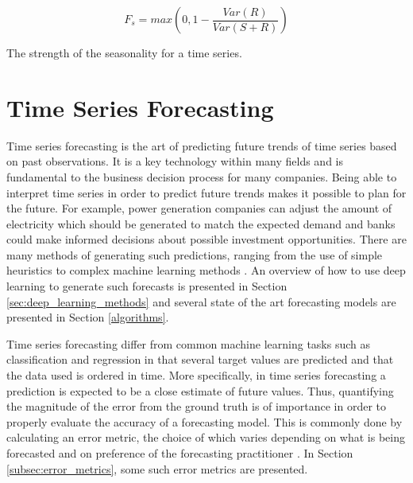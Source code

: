 \begin{eqfloat}
  \begin{equation}
    F_s = max(0,1-\frac{Var(R)}{Var(S + R)})
    \label{eq:strength_of_seasonality}
  \end{equation}
  \caption{The strength of the seasonality for a time series.}
\end{eqfloat}

\section{Time Series Forecasting}
\label{sec_time_series_forecasting}
Time series forecasting is the art of predicting future trends of time series based on past observations. It is a key technology within many fields and is fundamental to the business decision process for many companies. Being able to interpret time series in order to predict future trends makes it possible to plan for the future. For example, power generation companies can adjust the amount of electricity which should be generated to match the expected demand and banks could make informed decisions about possible investment opportunities. There are many methods of generating such predictions, ranging from the use of simple heuristics to complex machine learning methods \cite{hyndman_forecasting_3rd}. An overview of how to use deep learning to generate such forecasts is presented in Section \ref{sec:deep_learning_methods} and several state of the art forecasting models are presented in Section \ref{algorithms}.

Time series forecasting differ from common machine learning tasks such as classification and regression in that several target values are predicted and that the data used is ordered in time. More specifically, in time series forecasting a prediction is expected to be a close estimate of future values. Thus, quantifying the magnitude of the error from the ground truth is of importance in order to properly evaluate the accuracy of a forecasting model. This is commonly done by calculating an error metric, the choice of which varies depending on what is being forecasted and on preference of the forecasting practitioner \cite{hyndman_forecasting_3rd,hyndman_measuring_nodate, willmott_advantages_2005}. In Section \ref{subsec:error_metrics}, some such error metrics are presented.

